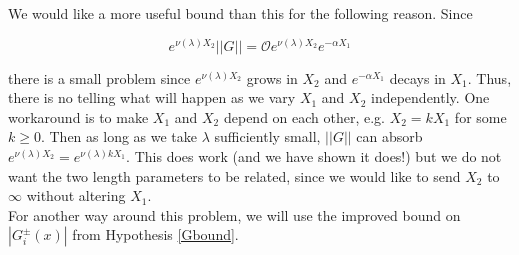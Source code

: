 \documentclass[12pt]{article}
\begin{document}
We would like a more useful bound than this for the following reason. Since 

\[
e^{\nu(\lambda)X_2} ||G|| = \mathcal{O} e^{\nu(\lambda)X_2} e^{-\alpha X_1}
\]

there is a small problem since $e^{\nu(\lambda)X_2}$ grows in $X_2$ and $e^{-\alpha X_1}$ decays in $X_1$. Thus, there is no telling what will happen as we vary $X_1$ and $X_2$ independently. One workaround is to make $X_1$ and $X_2$ depend on each other, e.g. $X_2 = k X_1$ for some $k \geq 0$. Then as long as we take $\lambda$ sufficiently small, $||G||$ can absorb $e^{\nu(\lambda)X_2} = e^{\nu(\lambda)k X_1}$. This does work (and we have shown it does!) but we do not want the two length parameters to be related, since we would like to send $X_2$ to $\infty$ without altering $X_1$.\\

For another way around this problem, we will use the improved bound on $|G_i^\pm(x)|$ from Hypothesis \ref{Gbound}.

\end{document}
